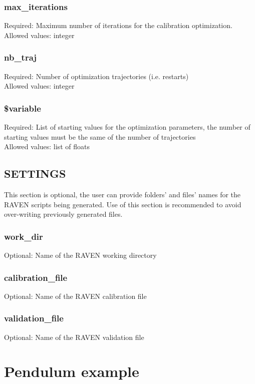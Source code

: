 \documentclass[oneside]{book}
\begin{document}
\subsubsection{max\_iterations}
Required: Maximum number of iterations for the calibration optimization. 
\\Allowed values: integer

\subsubsection{nb\_traj}
Required: Number of optimization trajectories (i.e. restarts)
\\Allowed values: integer

\subsubsection{\$variable}
Required: List of starting values for the optimization parameters, the number of starting values must be the same of the number of trajectories
\\Allowed values: list of floats

\subsection{SETTINGS}
This section is optional, the user can provide folders' and files' names for the RAVEN scripts being generated. Use of this section is recommended to avoid over-writing previously generated files. 

\subsubsection{work\_dir}
Optional: Name of the RAVEN working directory

\subsubsection{calibration\_file}
Optional: Name of the RAVEN calibration file

\subsubsection{validation\_file}
Optional: Name of the RAVEN validation file

\FloatBarrier
\section{Pendulum example}
\end{document}
